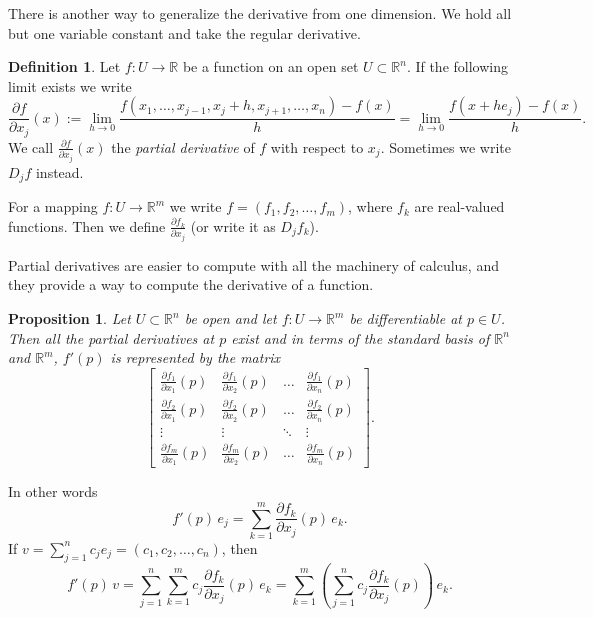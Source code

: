 \documentclass[12pt]{book}
\newcommand{\R}{{\mathbb{R}}}
\newcommand{\myindex}[1]{#1\index{#1}}
\theoremstyle{plain}
\newtheorem{prop}[thm]{Proposition}
\theoremstyle{remark}
\theoremstyle{definition}
\newtheorem{defn}[thm]{Definition}
\theoremstyle{exercise}
\theoremstyle{example}
\begin{document}
There is another way to generalize the derivative from one dimension.
We hold all but one variable constant and take the regular
derivative.

\begin{defn}
Let
$f \colon U \to \R$ be a function on an open set $U \subset \R^n$.
If the following limit exists we write
\begin{equation*}
\frac{\partial f}{\partial x_j} (x) := 
\lim_{h\to 0}\frac{f(x_1,\ldots,x_{j-1},x_j+h,x_{j+1},\ldots,x_n)-f(x)}{h}
=
\lim_{h\to 0}\frac{f(x+h e_j)-f(x)}{h} .
\end{equation*}
We call 
$\frac{\partial f}{\partial x_j} (x)$ the \emph{\myindex{partial derivative}}
of $f$
with respect to $x_j$.  Sometimes we write $D_j f$ instead.

For a mapping $f \colon U \to \R^m$ we write
$f = (f_1,f_2,\ldots,f_m)$, where $f_k$ are real-valued
functions.  Then we define
$\frac{\partial f_k}{\partial x_j}$ (or write it as $D_j f_k$).
\end{defn}

Partial derivatives are easier to compute with all the machinery of
calculus, and they provide a way to compute the derivative of a
function.

\begin{prop} \label{mv:prop:jacobianmatrix}
Let $U \subset \R^n$ be open and let $f \colon U \to \R^m$ be
differentiable at $p \in U$.  Then all the partial derivatives at $p$
exist and in terms of the standard basis of $\R^n$ and $\R^m$,
$f'(p)$ is represented by the matrix
\begin{equation*}
\begin{bmatrix}
\frac{\partial f_1}{\partial x_1}(p)
&
\frac{\partial f_1}{\partial x_2}(p)
& \ldots &
\frac{\partial f_1}{\partial x_n}(p)
\\
\frac{\partial f_2}{\partial x_1}(p)
&
\frac{\partial f_2}{\partial x_2}(p)
& \ldots &
\frac{\partial f_2}{\partial x_n}(p)
\\
\vdots & \vdots & \ddots & \vdots
\\
\frac{\partial f_m}{\partial x_1}(p)
&
\frac{\partial f_m}{\partial x_2}(p)
& \ldots &
\frac{\partial f_m}{\partial x_n}(p)
\end{bmatrix} .
\end{equation*}
\end{prop}


In other words
\begin{equation*}
f'(p) \, e_j =
\sum_{k=1}^m
\frac{\partial f_k}{\partial x_j}(p) \,e_k .
\end{equation*}
If $v = \sum_{j=1}^n c_j e_j = (c_1,c_2,\ldots,c_n)$, then
\begin{equation*}
f'(p) \, v =
\sum_{j=1}^n
\sum_{k=1}^m
 c_j
\frac{\partial f_k}{\partial x_j}(p) \,e_k
=
\sum_{k=1}^m
\left(
\sum_{j=1}^n
 c_j
\frac{\partial f_k}{\partial x_j}(p) \right) \,e_k .
\end{equation*}
\end{document}
